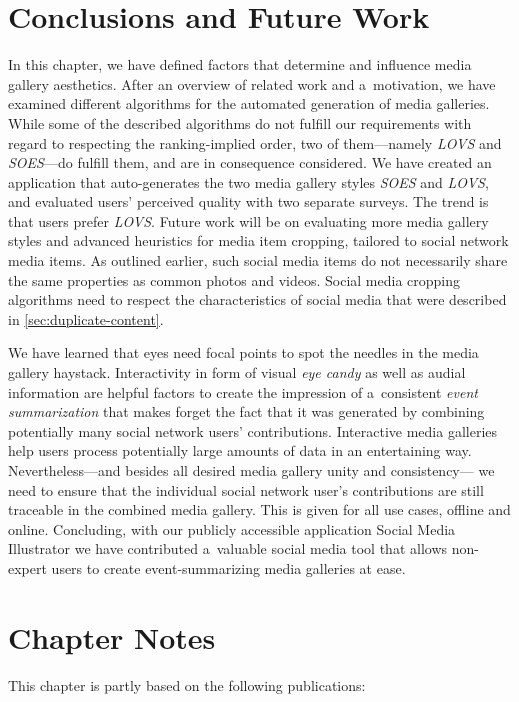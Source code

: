 \section{Conclusions and Future Work}

In this chapter, we have defined factors that determine and influence
media gallery aesthetics.
After an overview of related work and a~motivation,
we have examined different algorithms for the automated generation
of media galleries.
While some of the described algorithms do not fulfill our requirements
with regard to respecting the ranking-implied order,
two of them---namely \emph{LOVS} and \emph{SOES}---do fulfill them,
and are in consequence considered.
We have created an application that auto-generates the
two media gallery styles \emph{SOES} and \emph{LOVS},
and evaluated users' perceived quality with two separate surveys. 
The trend is that users prefer \emph{LOVS}.
Future work will be on evaluating more media gallery styles
and advanced heuristics for media item cropping,
tailored to social network media items.
As outlined earlier, such social media items
do not necessarily share the same properties as
common photos and videos.
Social media cropping algorithms need to respect 
the characteristics of social media
that were described in \autoref{sec:duplicate-content}.

We have learned that eyes need focal points
to spot the needles in the media gallery haystack.
Interactivity in form of visual \emph{eye candy}
as well as audial information are helpful factors
to create the impression of a~consistent \emph{event summarization}
that makes forget the fact that it was generated by combining potentially
many social network users' contributions.
Interactive media galleries help users process potentially
large amounts of data in an entertaining way.
Nevertheless---and besides all desired media gallery unity and consistency---%
we need to ensure that the individual social network user's contributions
are still traceable in the combined media gallery.
This is given for all use cases, offline and online.
Concluding, with our publicly accessible application Social Media Illustrator
we have contributed a~valuable social media tool
that allows non-expert users to create event-summarizing media galleries at ease.

\section*{Chapter Notes}
This chapter is partly based on the following publications:



